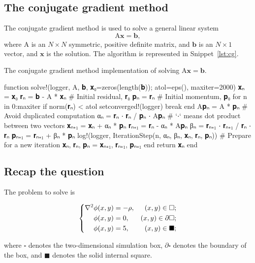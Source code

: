 \subsection{The conjugate gradient method}

The conjugate gradient method is used to solve a general linear system
%
\begin{equation}
    \mathrm{A} \bm{x} = \bm{b},
\end{equation}
%
where \(\mathrm{A}\) is an \(N \times N\) symmetric, positive definite
matrix, and \(\bm{b}\) is an \(N \times 1\)
vector, and \(\bm{x}\) is the solution.
The algorithm is represented in Snippet~\ref{lst:cg}.

\begin{algorithm}[!hbt]
    \caption{The conjugate gradient method implementation of solving
        \(\mathrm{ A }\bm{ x } = \bm{ b }\).}
    \label{lst:cg}
    \begin{juliacode}
function solve!(logger, A, 𝐛, 𝐱₀=zeros(length(𝐛)); atol=eps(), maxiter=2000)
    𝐱ₙ = 𝐱₀
    𝐫ₙ = 𝐛 - A * 𝐱ₙ  # Initial residual, 𝐫₀
    𝐩ₙ = 𝐫ₙ  # Initial momentum, 𝐩₀
    for n in 0:maxiter
        if norm(𝐫ₙ) < atol
            setconverged!(logger)
            break
        end
        A𝐩ₙ = A * 𝐩ₙ  # Avoid duplicated computation
        αₙ = 𝐫ₙ ⋅ 𝐫ₙ / 𝐩ₙ ⋅ A𝐩ₙ  # `⋅` means dot product between two vectors
        𝐱ₙ₊₁ = 𝐱ₙ + αₙ * 𝐩ₙ
        𝐫ₙ₊₁ = 𝐫ₙ - αₙ * A𝐩ₙ
        βₙ = 𝐫ₙ₊₁ ⋅ 𝐫ₙ₊₁ / 𝐫ₙ ⋅ 𝐫ₙ
        𝐩ₙ₊₁ = 𝐫ₙ₊₁ + βₙ * 𝐩ₙ
        log!(logger, IterationStep(n, αₙ, βₙ, 𝐱ₙ, 𝐫ₙ, 𝐩ₙ))
        # Prepare for a new iteration
        𝐱ₙ, 𝐫ₙ, 𝐩ₙ = 𝐱ₙ₊₁, 𝐫ₙ₊₁, 𝐩ₙ₊₁
    end
    return 𝐱ₙ
end
    \end{juliacode}
\end{algorithm}


\subsection{Recap the question}

The problem to solve is
%
\begin{spreadlines}{2ex} %
    \begin{equation}
        \begin{dcases}
            \begin{aligned}
                \nabla^2 \phi(x, y) & = -\rho, & (x, y) \in \square;         \\
                \phi(x, y)          & = 0,     & (x, y) \in \partial\square; \\
                \phi(x, y)          & = 5,     & (x, y) \in \blacksquare;
            \end{aligned}
        \end{dcases}
    \end{equation}
\end{spreadlines}
%
where \(\square\) denotes the two-dimensional simulation box,
\(\partial\square\) denotes the boundary of the box,
and \(\blacksquare\) denotes the solid internal square.


